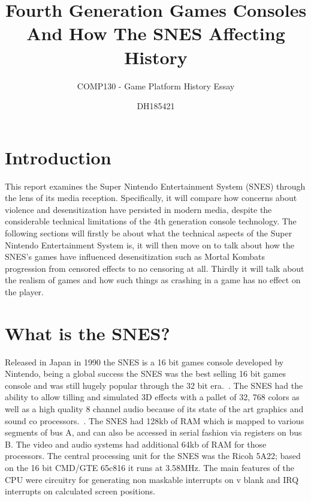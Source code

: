 \documentclass{scrartcl}
\title{Fourth Generation Games Consoles And How The SNES Affecting History}
\subtitle{COMP130 - Game Platform History Essay}
\author{DH185421}
\begin{document}
	
	\maketitle
	
	
	\section{Introduction}
	
	This report examines the Super Nintendo Entertainment System (SNES) through the lens of its media reception. Specifically, it will compare how concerns about violence and desensitization have persisted in modern media, despite the considerable technical limitations of the 4th generation console technology. The following sections will firstly be about what the technical aspects of the Super Nintendo Entertainment System is, it will then move on to talk about how the SNES's games have influenced desensitization such as Mortal Kombats progression from censored effects to no censoring at all. Thirdly it will talk about the realism of games and how such things as crashing in a game has no effect on the player.
	\section{What is the SNES?}
	Released in Japan in 1990 the SNES is a 16 bit games console developed by Nintendo, being a global success the SNES was the best selling 16 bit games console and was still hugely popular through the 32 bit era.~\cite{2}. The SNES had the ability to allow tilling and simulated 3D effects with a pallet of 32, 768 colors as well as a high quality 8 channel audio because of its state of the art graphics and sound co processors.~\cite{1}. The SNES had 128kb of RAM which is mapped to various segments of bus A, and can also be accessed in serial fashion via registers on bus B. The video and audio systems had additional 64kb of RAM for those processors. The central processing unit for the SNES was the Ricoh 5A22; based on the 16 bit CMD/GTE 65c816 it runs at 3.58MHz. The main features of the CPU were circuitry for generating non maskable interrupts on v blank and IRQ interrupts on calculated screen positions.~\cite{5}
\end{document}
